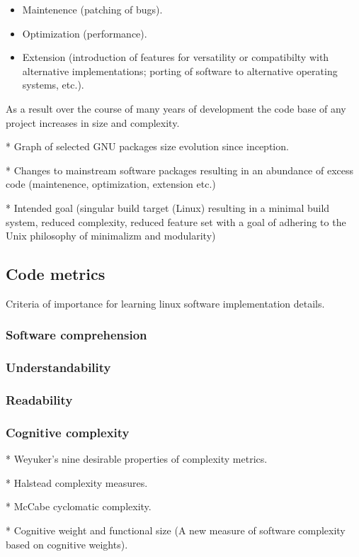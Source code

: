 \begin{itemize}
    \item Maintenence (patching of bugs).
    \item Optimization (performance).
    \item Extension (introduction of features for versatility or compatibilty with alternative implementations; porting of software to alternative operating systems, etc.).
\end{itemize}

As a result over the course of many years of development the code base of any project increases in size and complexity.

* Graph of selected GNU packages size evolution since inception.

* Changes to mainstream software packages resulting in an abundance of excess code (maintenence, optimization, extension etc.)

* Intended goal (singular build target (Linux) resulting in a minimal build system, reduced complexity, reduced feature set with a goal of adhering to the Unix philosophy of minimalizm and modularity)


\subsection{Code metrics}

Criteria of importance for learning linux software implementation details.

\subsubsection{Software comprehension}

\subsubsection{Understandability}

\subsubsection{Readability}

\subsubsection{Cognitive complexity}

* Weyuker's nine desirable properties of complexity metrics.

* Halstead complexity measures.

* McCabe cyclomatic complexity.

* Cognitive weight and functional size (A new measure of software complexity based on cognitive weights).
